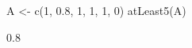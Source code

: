 \begin{Schunk}
% --begin: "quant2"
\begin{Sinput}
 A <- c(1, 0.8, 1, 1, 1, 0)
 atLeast5(A)
\end{Sinput}
\begin{Soutput}
[1] 0.8
\end{Soutput}
%
% --end: "quant2"
\end{Schunk}
